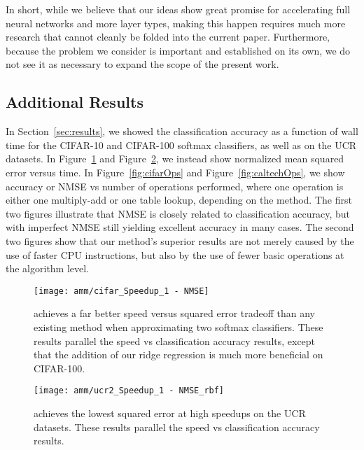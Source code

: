 In short, while we believe that our ideas show great promise for accelerating full neural networks and more layer types, making this happen requires much more research that cannot cleanly be folded into the current paper. Furthermore, because the problem we consider is important and established on its own, we do not see it as necessary to expand the scope of the present work.

\subsection{Additional Results}

In Section~\ref{sec:results}, we showed the classification accuracy as a function of wall time for the CIFAR-10 and CIFAR-100 softmax classifiers, as well as on the UCR datasets. In Figure~\ref{fig:cifarNMSE} and Figure~\ref{fig:ucrNMSE}, we instead show normalized mean squared error versus time. In Figure~\ref{fig:cifarOps} and Figure~\ref{fig:caltechOps}, we show accuracy or NMSE vs number of operations performed, where one operation is either one multiply-add or one table lookup, depending on the method. The first two figures illustrate that NMSE is closely related to classification accuracy, but with imperfect NMSE still yielding excellent accuracy in many cases. The second two figures show that our method's superior results are not merely caused by the use of faster CPU instructions, but also by the use of fewer basic operations at the algorithm level.

\begin{figure}[h]
\begin{center}
\texttt{[image: amm/cifar\_Speedup\_1 - NMSE]}
\caption{\oursp achieves a far better speed versus squared error tradeoff than any existing method when approximating two softmax classifiers. These results parallel the speed vs classification accuracy results, except that the addition of our ridge regression is much more beneficial on CIFAR-100.}
\label{fig:cifarNMSE}
\end{center}
\end{figure}

\begin{figure}[h]
\begin{center}
\texttt{[image: amm/ucr2\_Speedup\_1 - NMSE\_rbf]}
\caption{\oursp achieves the lowest squared error at high speedups on the UCR datasets. These results parallel the speed vs classification accuracy results.}
\label{fig:ucrNMSE}
\end{center}
\end{figure}

